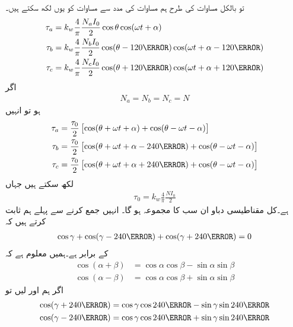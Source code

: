 تو بالکل مساوات  کی طرح ہم مساوات   کی مدد سے مساوات  کو یوں لکھ سکتے ہیں۔
\begin{gather}
\begin{aligned}
\tau_a&=k_w \frac{4}{\pi}\frac{N_a I_0}{2} \cos \theta \cos (\omega t +\alpha)\\
\tau_b&=k_w \frac{4}{\pi}\frac{N_b I_0}{2} \cos (\theta -120\degree)\cos (\omega t +\alpha -120\degree)\\
\tau_c&=k_w \frac{4}{\pi}\frac{N_c I_0}{2} \cos (\theta +120\degree)\cos (\omega t +\alpha +120\degree)
\end{aligned}
\end{gather}
اگر
\begin{align*}
N_a=N_b=N_c=N
\end{align*}
ہو تو انہیں
\begin{gather}
\begin{aligned}\label{مساوات_تبادلہ_تین_گھومتے_دباو}
\tau_a&=\frac{\tau_0}{2} \left[\cos (\theta +\omega t +\alpha) +\cos (\theta -\omega t -\alpha) \right]\\
\tau_b&=\frac{\tau_0}{2} \left[\cos (\theta +\omega t +\alpha-240\degree) +\cos (\theta -\omega t -\alpha) \right]\\
\tau_c&=\frac{\tau_0}{2} \left[\cos (\theta +\omega t +\alpha+240\degree) +\cos (\theta -\omega t -\alpha) \right]
\end{aligned}
\end{gather}
لکھ سکتے ہیں جہاں
\begin{align}
\tau_0=k_w \frac{4}{\pi}\frac{N I_0}{2}
\end{align}
ہے۔کل مقناطیسی دباو  ان سب کا مجموعہ ہو گا۔ انہیں جمع کرنے سے پہلے ہم ثابت کرتے ہیں کہ
\begin{align*}
\cos \gamma +\cos (\gamma -240\degree)+\cos (\gamma+240\degree)=0
\end{align*}
کے برابر ہے۔ہمیں معلوم ہے کہ 
\begin{align*}
\cos  (\alpha +\beta)&=\cos \alpha \cos \beta-\sin \alpha \sin \beta\\
\cos  (\alpha -\beta)&=\cos \alpha \cos \beta+\sin \alpha \sin \beta
\end{align*}
اگر ہم  اور  لیں تو
\begin{align*}
\cos (\gamma+240\degree)&=\cos \gamma \cos 240\degree-\sin \gamma \sin 240\degree\\
\cos (\gamma-240\degree)&=\cos \gamma \cos 240\degree+\sin \gamma \sin 240\degree
\end{align*}
